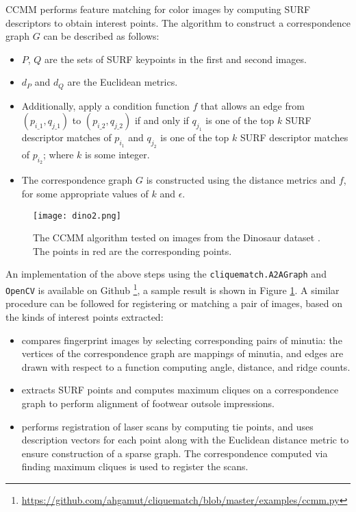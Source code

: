 \documentclass[12pt]{article}
\begin{document}
CCMM \citep{segundo2015} performs feature matching for color images by computing SURF
descriptors \citep{bay2006} to obtain interest points. The algorithm to construct
a correspondence graph $G$ can be described as follows:

\begin{itemize}
	\item $P$, $Q$ are the sets of SURF keypoints in the
	      first and second images.
	\item $d_P$ and $d_Q$ are the Euclidean metrics.
	\item Additionally, apply a condition function $f$ that allows an edge from
	      $(p_{i\_1}, q_{j\_1})$ to $(p_{i\_2}, q_{j\_2})$ if and only if $q_{j_1}$ is
	      one of the top $k$ SURF descriptor matches of $p_{i_1}$
	      and $q_{j_2}$ is one of the top $k$ SURF descriptor
	      matches of $p_{i_2}$; where $k$ is some integer.
	\item The correspondence graph $G$ is constructed using the distance metrics
	      and $f$, for some appropriate values of $k$ and
	      $\epsilon$.
\end{itemize}

\begin{figure}[htbp]
	\centering
	\texttt{[image: dino2.png]}
	\caption{The CCMM algorithm tested on images from the Dinosaur dataset \citep{vggdatasets}. The
		points in red are the corresponding points. }
	\label{fig:ccmm}
\end{figure}

An implementation of the above steps using the \texttt{cliquematch.A2AGraph} and
\texttt{OpenCV} is available on Github \footnote{\url{https://github.com/ahgamut/cliquematch/blob/master/examples/ccmm.py}}, a sample result
is shown in Figure \ref{fig:ccmm}. A similar procedure can be followed for
registering or matching a pair of images, based on the kinds of interest points
extracted:

\begin{itemize}
	\item \citep{fingerprint1999} compares fingerprint images by selecting corresponding pairs of
	      minutia: the vertices of the correspondence graph are mappings of minutia, and edges are
	      drawn with respect to a function computing angle, distance, and ridge counts.
	\item \citep{park2020} extracts SURF points and computes maximum cliques on a
	      correspondence graph to perform alignment of footwear outsole impressions.
	\item \citep{theiler2012} performs registration of laser scans by computing tie points, and
	      uses description vectors for each point along with the Euclidean distance metric to
	      ensure construction of a sparse graph. The correspondence computed via finding maximum
	      cliques is used to register the scans.
\end{itemize}
\end{document}
